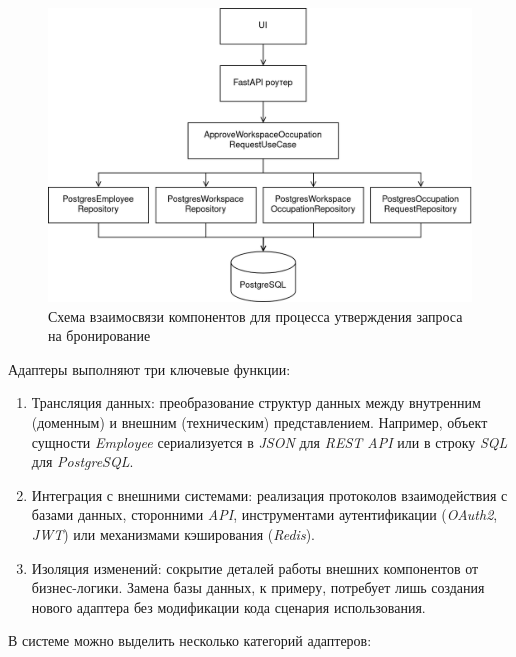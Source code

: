 \begin{figure}[h]
\centering
    \includegraphics[width=0.9\linewidth]{assets/clean-architecture-adapter-components.png}
    \caption{Схема взаимосвязи компонентов для процесса утверждения запроса на бронирование}
    \label{fig:system-implementation:software:clean-architecture-adapter-components}
\end{figure}

Адаптеры выполняют три ключевые функции:

\begin{enumerate}
    \item Трансляция данных: преобразование структур данных между внутренним (доменным) и внешним (техническим) представлением. Например, объект сущности \textit{Employee} сериализуется в \textit{JSON} для \textit{REST API} или в строку \textit{SQL} для \textit{PostgreSQL}.
    \item Интеграция с внешними системами: реализация протоколов взаимодействия с базами данных, сторонними \textit{API}, инструментами аутентификации (\textit{OAuth2}, \textit{JWT}) или механизмами кэширования (\textit{Redis}).
    \item Изоляция изменений: сокрытие деталей работы внешних компонентов от бизнес-логики. Замена базы данных, к примеру, потребует лишь создания нового адаптера без модификации кода сценария использования.
\end{enumerate}

В системе можно выделить несколько категорий адаптеров:

